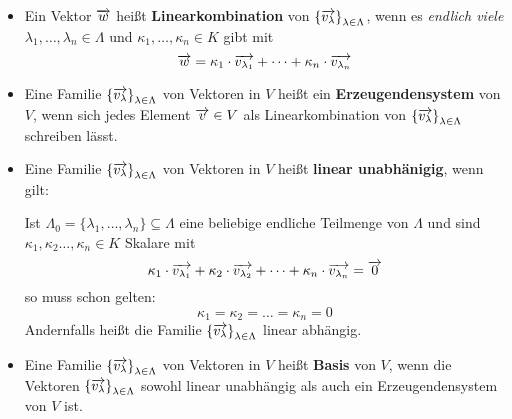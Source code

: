 \begin{definition}\leavevmode\newline
\vspace{-0.8cm} 

\begin{itemize}
\item Ein Vektor $\overrightarrow{w}$ 
heißt \textbf{Linearkombination} von $\left\{ 
\overrightarrow{v_{\lambda}} \right\}_{\lambda \in \Lambda}$, wenn es \textit{endlich 
viele} $\lambda_1, \ldots , \lambda_n \in \Lambda$  und $\kappa_1, \ldots, 
\kappa_n \in K$ gibt mit 
  	$$ \overrightarrow{w} = \kappa_1 \cdot \overrightarrow{v_{\lambda_1}} + \cdots 
	+ \kappa_n \cdot \overrightarrow{v_{\lambda_n}} $$
\item Eine Familie  $\left\{ \overrightarrow{v_{\lambda}} \right\}_{\lambda \in 
\Lambda}$ von Vektoren in $V$ heißt ein \textbf{Erzeugendensystem} 
von $V$, wenn sich jedes Element $\overrightarrow{v} \in V$ als 
Linearkombination von $\left\{ \overrightarrow{v_{\lambda}} \right\}_{\lambda 
\in \Lambda}$ schreiben lässt.
\item Eine Familie  $\left\{ \overrightarrow{v_{\lambda}} \right\}_{\lambda \in \Lambda}$ von 
Vektoren in $V$ heißt \textbf{linear 
unabhänigig}, wenn gilt:

Ist $\Lambda_0 = \{\lambda_1, \ldots , \lambda_n \} \subseteq \Lambda$ eine beliebige endliche Teilmenge von 
$\Lambda$ und sind $\kappa_1, \kappa_2 \ldots, \kappa_n \in K$ Skalare mit 
  	$$ \kappa_1 \cdot \overrightarrow{v_{\lambda_1}} + \kappa_2 \cdot 
    	\overrightarrow{v_{\lambda_2}} + \cdots 
 	+ \kappa_n \cdot \overrightarrow{v_{\lambda_n}} = \overrightarrow{0} $$
so muss schon gelten:
  	$$ \kappa_1 = \kappa_2 = \ldots = \kappa_n = 0 $$
Andernfalls heißt die Familie $\left\{ \overrightarrow{v_{\lambda}} \right\}_{\lambda \in \Lambda}$ linear 
abhängig.
\item Eine Familie  $\left\{ \overrightarrow{v_{\lambda}} \right\}_{\lambda \in 
\Lambda}$ von Vektoren in $V$ heißt  
\textbf{Basis} von $V$, wenn die Vektoren $\left\{ \overrightarrow{v_{\lambda}} 
\right\}_{\lambda \in \Lambda}$ sowohl linear unabhängig als auch ein 
Erzeugendensystem von $V$ ist.
\end{itemize}
\end{definition}

